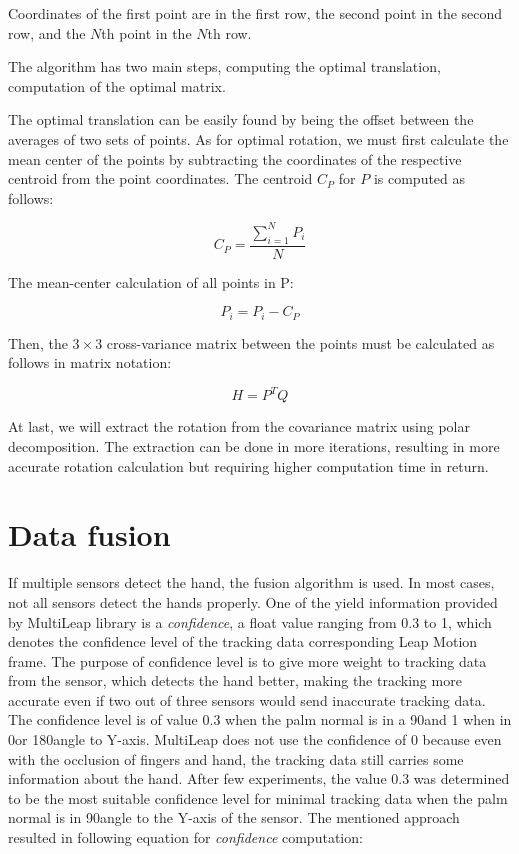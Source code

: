 Coordinates of the first point are in the first row, the second point in the second row, and the $N$th point in the $N$th row.

The algorithm has two main steps, computing the optimal translation, computation of the optimal matrix.

The optimal translation can be easily found by being the offset between the averages of two sets of points. As for optimal rotation, we must first calculate the mean center of the points by subtracting the coordinates of the respective centroid from the point coordinates. The centroid $C_P$ for $P$ is computed as follows:

\begin{equation}
    {C_P = {\frac{\sum_{i=1}^{N}P_i}{N}}}
\end{equation}

The mean-center calculation of all points in P:

\begin{equation}
    {P_i = P_i - C_P}
\end{equation}

Then, the $3\times3$ cross-variance matrix between the points must be calculated as follows in matrix notation:

\begin{equation}
    {H = P^T Q}
\end{equation}

At last, we will extract the rotation from the covariance matrix using polar decomposition. The extraction can be done in more iterations, resulting in more accurate rotation calculation but requiring higher computation time in return.

\section{Data fusion}

If multiple sensors detect the hand, the fusion algorithm is used. In most cases, not all sensors detect the hands properly. One of the yield information provided by MultiLeap library is a \textit{confidence}, a float value ranging from 0.3 to 1, which denotes the confidence level of the tracking data corresponding Leap Motion frame. The purpose of confidence level is to give more weight to tracking data from the sensor, which detects the hand better, making the tracking more accurate even if two out of three sensors would send inaccurate tracking data. The confidence level is of value 0.3 when the palm normal is in a 90\textdegree and 1 when in 0\textdegree or 180\textdegree angle to Y-axis. MultiLeap does not use the confidence of 0 because even with the occlusion of fingers and hand, the tracking data still carries some information about the hand. After few experiments, the value 0.3 was determined to be the most suitable confidence level for minimal tracking data when the palm normal is in 90\textdegree angle to the Y-axis of the sensor. The mentioned approach resulted in following equation for \textit{confidence} computation:


